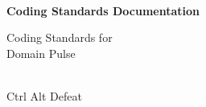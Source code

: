 \begin{titlepage}
    \centering



    \vspace{2cm}
    \hrulefill\\
    \vspace{1cm}
    {\Huge\bfseries Coding Standards Documentation}

    \vspace{1cm}

    {\Large Coding Standards for\\Domain Pulse}\\
    \vspace{1cm}
    \hrulefill\\

    \vfill

    {\large Ctrl Alt Defeat}

    \vspace{1cm}


\end{titlepage}